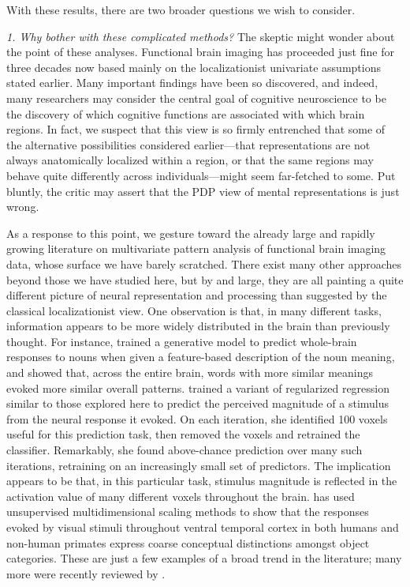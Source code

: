 With these results, there are two broader questions we wish to consider.

{\em 1. Why bother with these complicated methods?} The skeptic might wonder about the point of these analyses. Functional brain imaging has proceeded just fine for three decades now based mainly on the localizationist univariate assumptions stated earlier. Many important findings have been so discovered, and indeed, many researchers may consider the central goal of cognitive neuroscience to be the discovery of which cognitive functions are associated with which brain regions. In fact, we suspect that this view is so firmly entrenched that some of the alternative possibilities considered earlier---that representations are not always anatomically localized within a region, or that the same regions may behave quite differently across individuals---might seem far-fetched to some. Put bluntly, the critic may assert that the PDP view of mental representations is just wrong. 

As a response to this point, we gesture toward the already large and rapidly growing literature on multivariate pattern analysis of functional brain imaging data, whose surface we have barely scratched. There exist many other approaches beyond those we have studied here, but by and large, they are all painting a quite different picture of neural representation and processing than suggested by the classical localizationist view. One observation is that, in many different tasks, information appears to be more widely distributed in the brain than previously thought. For instance,  trained a generative model to predict whole-brain responses to nouns when given a feature-based description of the noun meaning, and showed that, across the entire brain, words with more similar meanings evoked more similar overall patterns.  trained a variant of regularized regression similar to those explored here to predict the perceived magnitude of a stimulus from the neural response it evoked. On each iteration, she identified 100 voxels useful for this prediction task, then removed the voxels and retrained the classifier. Remarkably, she found above-chance prediction over many such iterations, retraining on an increasingly small set of predictors. The implication appears to be that, in this particular task, stimulus magnitude is reflected in the activation value of many different voxels throughout the brain.  has used unsupervised multidimensional scaling methods to show that the responses evoked by visual stimuli throughout ventral temporal cortex in both humans and non-human primates express coarse conceptual distinctions amongst object categories. These are just a few examples of a broad trend in the literature; many more were recently reviewed by .

